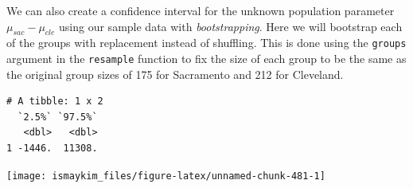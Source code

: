 \documentclass[12pt, krantz2,]{krantz}
\makeatletter
\newenvironment{Shaded}{\begin{snugshade}}{\end{snugshade}}
\newcommand{\DataTypeTok}[1]{\textcolor[rgb]{0.27,0.27,0.27}{#1}}
\newcommand{\DecValTok}[1]{\textcolor[rgb]{0.06,0.06,0.06}{#1}}
\newcommand{\KeywordTok}[1]{\textcolor[rgb]{0.27,0.27,0.27}{\textbf{#1}}}
\newcommand{\NormalTok}[1]{#1}
\newcommand{\OperatorTok}[1]{\textcolor[rgb]{0.43,0.43,0.43}{\textbf{#1}}}
\newcommand{\StringTok}[1]{\textcolor[rgb]{0.5,0.5,0.5}{#1}}
\newenvironment{kframe}{%
\medskip{}
\setlength{\fboxsep}{.8em}
 \def\at@end@of@kframe{}%
 \ifinner\ifhmode%
  \def\at@end@of@kframe{\end{minipage}}%
  \begin{minipage}{\columnwidth}%
 \fi\fi%
 \def\FrameCommand##1{\hskip\@totalleftmargin \hskip-\fboxsep
 \colorbox{shadecolor}{##1}\hskip-\fboxsep
     \hskip-\linewidth \hskip-\@totalleftmargin \hskip\columnwidth}%
 \MakeFramed {\advance\hsize-\width
   \@totalleftmargin\z@ \linewidth\hsize
   \@setminipage}}%
 {\par\unskip\endMakeFramed%
 \at@end@of@kframe}
\renewenvironment{Shaded}{\begin{kframe}}{\end{kframe}}
\makeatother
\begin{document}
We can also create a confidence interval for the unknown population parameter \(\mu_{sac} - \mu_{cle}\) using our sample data with \emph{bootstrapping}. Here we will bootstrap each of the groups with replacement instead of shuffling. This is done using the \texttt{groups}
argument in the \texttt{resample} function to fix the size of each group to
be the same as the original group sizes of 175 for Sacramento and 212 for Cleveland.

\begin{Shaded}
\end{Shaded}

\begin{Shaded}
\end{Shaded}

\begin{verbatim}
# A tibble: 1 x 2
  `2.5%` `97.5%`
   <dbl>   <dbl>
1 -1446.  11308.
\end{verbatim}

\begin{Shaded}
\end{Shaded}

\begin{center}\texttt{[image: ismaykim\_files/figure-latex/unnamed-chunk-481-1]} \end{center}
\end{document}
